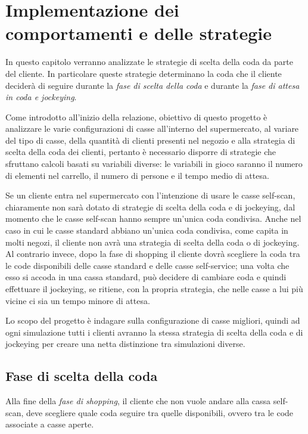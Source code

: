 \chapter{Implementazione dei comportamenti e delle strategie}
\label{implementation:intro}

In questo capitolo verranno analizzate le strategie di scelta della coda da parte del cliente. In particolare queste strategie determinano la coda che il cliente deciderà di seguire durante la \textit{fase di scelta della coda} e durante la \textit{fase di attesa in coda e jockeying}. 

Come introdotto all'inizio della relazione, obiettivo di questo progetto è analizzare le varie configurazioni di casse all'interno del supermercato, al variare del tipo di casse, della quantità di clienti presenti nel negozio e alla strategia di scelta della coda dei clienti, pertanto è necessario disporre di strategie che sfruttano calcoli basati su variabili diverse: le variabili in gioco saranno il numero di elementi nel carrello, il numero di persone e il tempo medio di attesa.

Se un cliente entra nel supermercato con l'intenzione di usare le casse self-scan, chiaramente non sarà dotato di strategie di scelta della coda e di jockeying, dal momento che le casse self-scan hanno sempre un'unica coda condivisa. Anche nel caso in cui le casse standard abbiano un'unica coda condivisa, come capita in molti negozi, il cliente non avrà una strategia di scelta della coda o di jockeying. Al contrario invece, dopo la fase di shopping il cliente dovrà scegliere la coda tra le code disponibili delle casse standard e delle casse self-service; una volta che esso si accoda in una cassa standard, può decidere di cambiare coda e quindi effettuare il jockeying, se ritiene, con la propria strategia, che nelle casse a lui più vicine ci sia un tempo minore di attesa.

Lo scopo del progetto è indagare sulla configurazione di casse migliori, quindi ad ogni simulazione tutti i clienti avranno la stessa strategia di scelta della coda e di jockeying per creare una netta distinzione tra simulazioni diverse.

\section{Fase di scelta della coda}
\label{implementation:queuechoice}

Alla fine della \textit{fase di shopping}, il cliente che non vuole andare alla cassa self-scan, deve scegliere quale coda seguire tra quelle disponibili, ovvero tra le code associate a casse aperte. 

